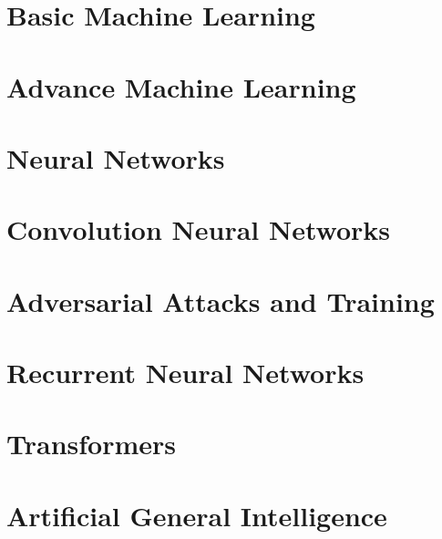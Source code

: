 \documentclass[12pt]{book}
\begin{document}
\mainmatter
\part{Basic Machine Learning}




\part{Advance Machine Learning}
\part{Neural Networks}

\part{Convolution Neural Networks}

\part{Adversarial Attacks and Training}


\part{Recurrent Neural Networks}

\part{Transformers}

\part{Artificial General Intelligence}



\backmatter


\end{document}
